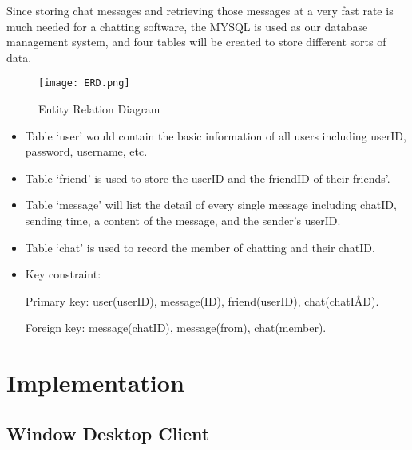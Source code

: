 \documentclass[a4paper,11pt]{article}
\begin{document}




Since storing chat messages and retrieving those messages at a very fast rate is much needed for a chatting software, the MYSQL is used as our database management system, and four tables will be created to store different sorts of data.


\begin{figure}[h]
\centering
\texttt{[image: ERD.png]}
\caption{\label{fig:ERD}Entity Relation Diagram}
\end{figure}

\begin{itemize}
\item Table ‘user’ would contain the basic information of all users including userID, password, username, etc. 
\item Table ‘friend’ is used to store the userID and the friendID of their friends’.
\item Table ‘message’ will list the detail of every single message including chatID, sending time, a content of the message, and the sender’s userID.
\item Table ‘chat’ is used to record the member of chatting and their chatID. 
\end{itemize}


\begin{itemize}
\item Key constraint:

Primary key: user(userID), message(ID), friend(userID), chat(chatIÅD).

Foreign key: message(chatID), message(from), chat(member).

\end{itemize}

\section{Implementation}
\subsection{Window Desktop Client}
\end{document}
